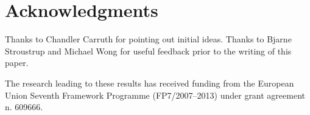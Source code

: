 \section*{Acknowledgments}

Thanks to Chandler Carruth for pointing out initial ideas. Thanks to
Bjarne Stroustrup and Michael Wong for useful feedback prior to the
writing of this paper.

The research leading to these results has received funding from the European
Union Seventh Framework Programme (FP7/2007--2013) under grant agreement n.
609666.
